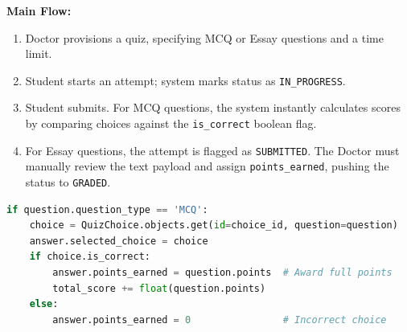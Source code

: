 \textbf{Main Flow:}
\begin{enumerate}
    \item Doctor provisions a quiz, specifying MCQ or Essay questions and a time limit.
    \item Student starts an attempt; system marks status as \texttt{IN\_PROGRESS}.
    \item Student submits. For MCQ questions, the system instantly calculates scores by comparing choices against the \texttt{is\_correct} boolean flag.
    \item For Essay questions, the attempt is flagged as \texttt{SUBMITTED}. The Doctor must manually review the text payload and assign \texttt{points\_earned}, pushing the status to \texttt{GRADED}.
\end{enumerate}

\begin{lstlisting}[language=Python, caption=Real-time Auto-grading Logic for MCQ Quizzes (\texttt{quiz\_views.py})]
if question.question_type == 'MCQ':
    choice = QuizChoice.objects.get(id=choice_id, question=question)
    answer.selected_choice = choice
    if choice.is_correct:
        answer.points_earned = question.points  # Award full points
        total_score += float(question.points)
    else:
        answer.points_earned = 0                # Incorrect choice
\end{lstlisting}